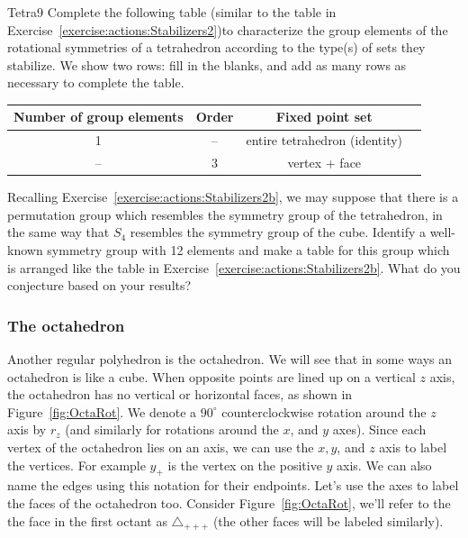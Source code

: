 \begin{exercise}{Tetra9}
Complete the following table (similar to the table in Exercise~\ref{exercise:actions:Stabilizers2})to characterize the group elements of the rotational symmetries of a tetrahedron according to the type(s) of sets they stabilize.  We show two rows: fill in the blanks, and add as many rows as necessary to complete the table.
  
\begin{tabular}{| c |c|c| r |} \hline
 \textbf{ Number of group elements} & \textbf{Order} & \textbf{Fixed point set} \\ \hline
  1&  --& entire tetrahedron (identity) \\ \hline
  -- & 3& vertex + face \\   
\end{tabular}

\end{exercise}
\begin{exercise}{}
Recalling Exercise~\ref{exercise:actions:Stabilizers2b}, we may suppose that there is a permutation group which resembles the symmetry group of the tetrahedron, in the same way that $S_4$ resembles the symmetry group of the cube. Identify a well-known symmetry group with 12 elements and  make a table for this group which is arranged like the table in Exercise~\ref{exercise:actions:Stabilizers2b}. What do you conjecture based on your results?
\end{exercise}
\subsubsection*{The octahedron}
Another regular polyhedron is the octahedron.  We will see that in some ways an octahedron is like a cube. 
When opposite points are lined up  on a vertical $z$ axis, the octahedron has no vertical or horizontal faces, as shown in Figure~\ref{fig:OctaRot}.  We denote a  $90^{\circ}$ counterclockwise rotation around the $z$ axis by $r_z$ (and similarly for rotations around the $x$, and $y$ axes).
Since each vertex of the octahedron lies on an axis, we can use the $x,y$, and $z$ axis to label the vertices.  For example $y_+$ is the vertex on the positive $y$ axis.   We can also name the edges using this notation for their endpoints.   Let's use the axes to label the faces of the octahedron too.  Consider Figure~\ref{fig:OctaRot}, we'll refer to the the face in the first octant as $\triangle_{ +++}$ (the other faces will be labeled similarly).

